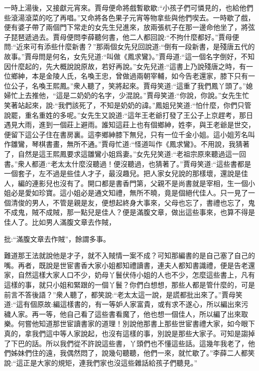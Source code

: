 \begin{parag}
    一時上湯後，又接獻元宵來。賈母便命將戲暫歇歇:“小孩子們可憐見的，也給他們些滾湯滾菜的吃了再唱。”又命將各色果子元宵等物拿些與他們喫去。一時歇了戲，便有婆子帶了兩個門下常走的女先生兒進來，放兩張杌子在那一邊命他坐了，將弦子琵琶遞過去。賈母便問李薛聽何書，他二人都回說:“不拘什麼都好。”賈母便問:“近來可有添些什麼新書？”那兩個女先兒回說道:“倒有一段新書，是殘唐五代的故事。”賈母問是何名，女先兒道:“叫做《鳳求鸞》。”賈母道:“這一個名字倒好，不知因什麼起的，先大概說說原故，若好再說。”女先兒道:“這書上乃說殘唐之時，有一位鄉紳，本是金陵人氏，名喚王忠，曾做過兩朝宰輔，如今告老還家，膝下只有一位公子，名喚王熙鳳。”衆人聽了，笑將起來。賈母笑道:“這重了我們鳳丫頭了。”媳婦忙上去推他，“這是二奶奶的名字，少混說。”賈母笑道:“你說，你說。”女先生忙笑著站起來，說:“我們該死了，不知是奶奶的諱。”鳳姐兒笑道:“怕什麼，你們只管說罷，重名重姓的多呢。”女先生又說道:“這年王老爺打發了王公子上京趕考，那日遇見大雨，進到一個莊上避雨。誰知這莊上也有個鄉紳，姓李，與王老爺是世交，便留下這公子住在書房裏。這李鄉紳膝下無兒，只有一位千金小姐。這小姐芳名叫作雛鸞，琴棋書畫，無所不通。”賈母忙道:“怪道叫作《鳳求鸞》。不用說，我猜著了，自然是這王熙鳳要求這雛鸞小姐爲妻。”女先兒笑道:“老祖宗原來聽過這一回書。”衆人都道:“老太太什麼沒聽過！便沒聽過，也猜著了。”賈母笑道:“這些書都是一個套子，左不過是些佳人才子，最沒趣兒。把人家女兒說的那樣壞，還說是佳人，編的連影兒也沒有了。開口都是書香門第，父親不是尚書就是宰相，生一個小姐必是愛如珍寶。這小姐必是通文知禮，無所不曉，竟是個絕代佳人。只一見了一個清俊的男人，不管是親是友，便想起終身大事來，父母也忘了，書禮也忘了，鬼不成鬼，賊不成賊，那一點兒是佳人？便是滿腹文章，做出這些事來，也算不得是佳人了。比如男人滿腹文章去作賊，\begin{note}批:“滿腹文章去作賊”，餘謂多事。\end{note}難道那王法就說他是才子，就不入賊情一案不成？可知那編書的是自己塞了自己的嘴。再者，既說是世宦書香大家小姐都知禮讀書，連夫人都知書識禮，便是告老還家，自然這樣大家人口不少，奶母丫鬟伏侍小姐的人也不少，怎麼這些書上，凡有這樣的事，就只小姐和緊跟的一個丫鬟？你們白想想，那些人都是管什麼的，可是前言不答後語？”衆人聽了，都笑說:“老太太這一說，是謊都批出來了。”賈母笑道:“這有個原故:編這樣書的，有一等妒人家富貴，或有求不遂心，所以編出來污穢人家。再一等，他自己看了這些書看魔了，他也想一個佳人，所以編了出來取樂。何嘗他知道那世宦讀書家的道理！別說他那書上那些世宦書禮大家，如今眼下真的，拿我們這中等人家說起，也沒有這樣的事，別說是那些大家子。可知是謅掉了下巴的話。所以我們從不許說這些書，丫頭們也不懂這些話。這幾年我老了，他們姊妹們住的遠，我偶然悶了，說幾句聽聽，他們一來，就忙歇了。”李薛二人都笑說:“這正是大家的規矩，連我們家也沒這些雜話給孩子們聽見。”
\end{parag}


